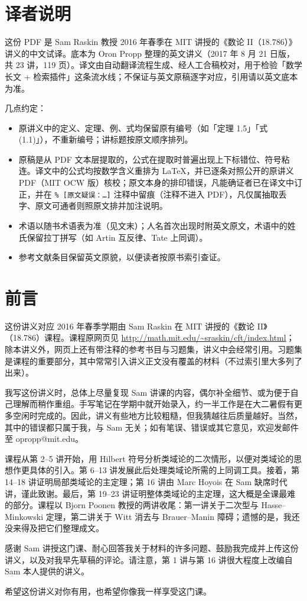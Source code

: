 \section*{译者说明}

这份 PDF 是 Sam Raskin 教授 2016 年春季在 MIT 讲授的《数论 II（18.786）》讲义的中文试译。底本为 Oron Propp 整理的英文讲义（2017 年 8 月 21 日版，共 23 讲，119 页）。译文由自动翻译流程生成、经人工合稿校对，用于检验「数学长文 + 检索插件」这条流水线；不保证与英文原稿逐字对应，引用请以英文底本为准。

几点约定：
\begin{itemize}[leftmargin=2em]
  \item 原讲义中的定义、定理、例、式均保留原有编号（如「定理 1.5」「式 (1.1)」），不重新编号；讲标题按原文顺序排列。
  \item 原稿是从 PDF 文本层提取的，公式在提取时普遍出现上下标错位、符号粘连。译文中的公式均按数学含义重排为 \LaTeX{}，并已逐条对照公开的原讲义 PDF（MIT OCW 版）核校；原文本身的排印错误，凡能确证者已在译文中订正，并在 \texttt{\% [原文疑误：…]} 注释中留痕（注释不进入 PDF），凡仅属抽取丢字、原文可通者则照原文排并加注说明。
  \item 术语以随书术语表为准（见文末）；人名首次出现时附英文原文，术语中的姓氏保留拉丁拼写（如 Artin 互反律、Tate 上同调）。
  \item 参考文献条目保留英文原貌，以便读者按原书索引查证。
\end{itemize}

\section*{前言}

这份讲义对应 2016 年春季学期由 Sam Raskin 在 MIT 讲授的《数论 II》（18.786）课程。课程原网页见 \url{http://math.mit.edu/~sraskin/cft/index.html}；除本讲义外，网页上还有带注释的参考书目与习题集，讲义中会经常引用。习题集是课程的重要部分，其中常常引入讲义正文没有覆盖的材料（不过索引里大多列了出来）。

我写这份讲义时，总体上尽量复现 Sam 讲课的内容，偶尔补全细节、或为便于自己理解而稍作重组。手写笔记在学期中就开始录入，约一半工作是在大二暑假有更多空闲时完成的。因此，讲义有些地方比较粗糙，但我猜越往后质量越好。当然，其中的错误都只属于我，与 Sam 无关；如有笔误、错误或其它意见，欢迎发邮件至 opropp@mit.edu。

课程从第 2–5 讲开始，用 Hilbert 符号分析类域论的二次情形，以便对类域论的思想作更具体的引入。第 6–13 讲发展此后处理类域论所需的上同调工具。接着，第 14–18 讲证明局部类域论的主定理；第 16 讲由 Marc Hoyois 在 Sam 缺席时代讲，谨此致谢。最后，第 19–23 讲证明整体类域论的主定理，这大概是全课最难的部分。课程以 Bjorn Poonen 教授的两讲收尾：第一讲关于二次型与 Hasse--Minkowski 定理，第二讲关于 Witt 消去与 Brauer--Manin 障碍；遗憾的是，我还没来得及把它们整理成文。

感谢 Sam 讲授这门课、耐心回答我关于材料的许多问题、鼓励我完成并上传这份讲义，以及对我早先草稿的评论。请注意，第 1 讲与第 16 讲很大程度上改编自 Sam 本人提供的讲义。

希望这份讲义对你有用，也希望你像我一样享受这门课。
